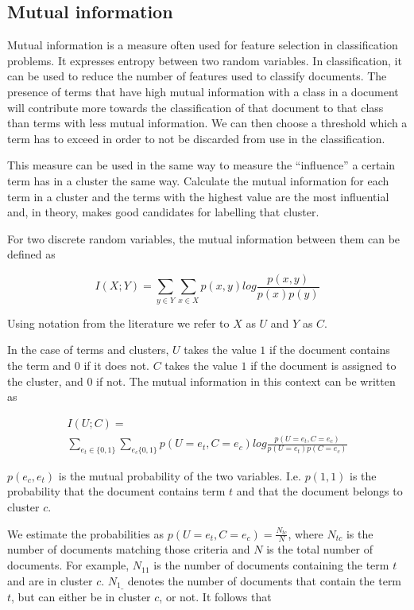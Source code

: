 \documentclass[letterpaper, 10 pt, conference]{ieeeconf}
\begin{document}
\subsection{Mutual information}

Mutual information is a measure often used for feature selection in
classification problems. It expresses entropy between two random variables. In
classification, it can be used to reduce the number of features used to classify
documents. The presence of terms that have high mutual information with a class
in a document will contribute more towards the classification of that document
to that class than terms with less mutual
information.\cite{manning2008introduction} We can then choose a threshold which
a term has to exceed in order to not be discarded from use in the
classification.\cite{baeza1999modern}

This measure can be used in the same way to measure the ``influence'' a certain
term has in a cluster the same way. Calculate the mutual information for each
term in a cluster and the terms with the highest value are the most influential
and, in theory, makes good candidates for labelling that cluster.

For two discrete random variables, the mutual information between them can be
defined as

$$
I(X;Y) = \sum_{y \in Y} \sum_{x \in X} p(x,y) log \frac{p(x,y)}{p(x)p(y)}
$$

Using notation from the literature we refer to $X$ as $U$ and $Y$ as
$C$\cite{manning2008introduction}.

In the case of terms and clusters, $U$ takes the value $1$ if the
document contains the term and $0$ if it does not. $C$ takes the value $1$ if
the document is assigned to the cluster, and $0$ if not. The mutual information
in this context can be written as

\begin{gather*}
I(U;C) = \\
\sum_{e_t \in \{0,1\}} \sum_{e_c \{0,1\}} p(U = e_t, C = e_c) log
\frac{p(U = e_t, C = e_c)}{p(U = e_t)p(C = e_c)}
\end{gather*}

$p(e_c, e_t)$ is the mutual probability of the two variables. I.e. $p(1,1)$ is
the probability that the document contains term $t$ and that the document
belongs to cluster $c$.\cite{manning2008introduction}

We estimate the probabilities as $p(U=e_t, C=e_c) = \frac{N_{tc}}{N}$,
where $N_{tc}$ is the number of documents matching those criteria and $N$ is
the total number of documents\cite{manning2008introduction}. For example,
$N_{11}$ is the number of documents containing the term $t$ and are in cluster
$c$. $N_{1\_}$ denotes the number of documents that contain the term $t$, but
can either be in cluster $c$, or not. It follows that
\end{document}

